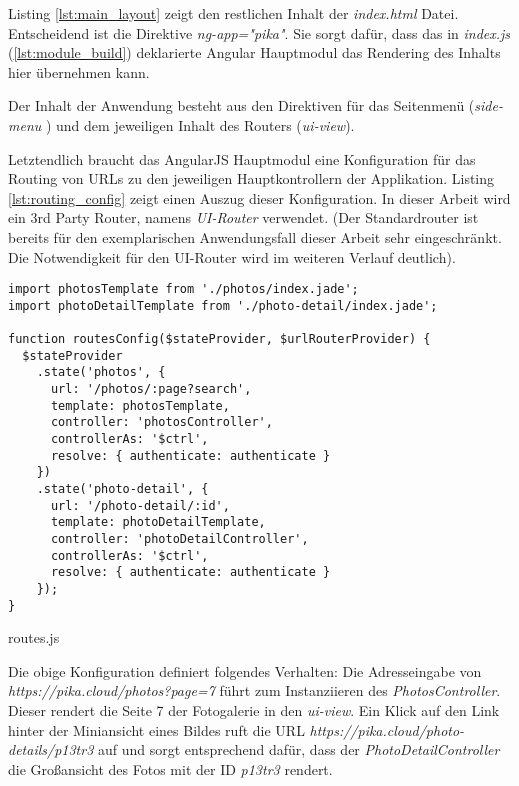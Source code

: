 Listing \ref{lst:main_layout} zeigt den restlichen Inhalt der \textit{index.html} Datei. Entscheidend ist die Direktive \textit{ng-app="pika"}. Sie sorgt dafür, dass das in \textit{index.js} (\ref{lst:module_build}) deklarierte Angular Hauptmodul das Rendering des Inhalts hier übernehmen kann.

Der Inhalt der Anwendung besteht aus den Direktiven für das Seitenmenü (\textit{side-menu} ) und dem jeweiligen Inhalt des Routers (\textit{ui-view}). 

Letztendlich braucht das AngularJS Hauptmodul eine Konfiguration für das Routing von URLs zu den jeweiligen Hauptkontrollern der Applikation. Listing \ref{lst:routing_config} zeigt einen Auszug dieser Konfiguration. In dieser Arbeit wird ein 3rd Party Router, namens \textit{UI-Router} verwendet. (Der Standardrouter ist bereits für den exemplarischen Anwendungsfall dieser Arbeit sehr eingeschränkt. Die Notwendigkeit für den UI-Router wird im weiteren Verlauf deutlich).

\begin{listing}[H]
\begin{verbatim}
import photosTemplate from './photos/index.jade';
import photoDetailTemplate from './photo-detail/index.jade';

function routesConfig($stateProvider, $urlRouterProvider) {
  $stateProvider
    .state('photos', {
      url: '/photos/:page?search',
      template: photosTemplate,
      controller: 'photosController',
      controllerAs: '$ctrl',
      resolve: { authenticate: authenticate }
    })
    .state('photo-detail', {
      url: '/photo-detail/:id',
      template: photoDetailTemplate,
      controller: 'photoDetailController',
      controllerAs: '$ctrl',
      resolve: { authenticate: authenticate }
    });
}

\end{verbatim}
\caption{routes.js}
\label{lst:routing_config}
\end{listing}

Die obige Konfiguration definiert folgendes Verhalten:
Die Adresseingabe von \textit{https://pika.cloud/photos?page=7} führt zum Instanziieren des \textit{PhotosController}. Dieser rendert die Seite 7 der Fotogalerie in den \textit{ui-view}. Ein Klick auf den Link hinter der Miniansicht eines Bildes ruft die URL \textit{https://pika.cloud/photo-details/p13tr3} auf und sorgt entsprechend dafür, dass der \textit{PhotoDetailController} die Großansicht des Fotos mit der ID  \textit{p13tr3} rendert.

